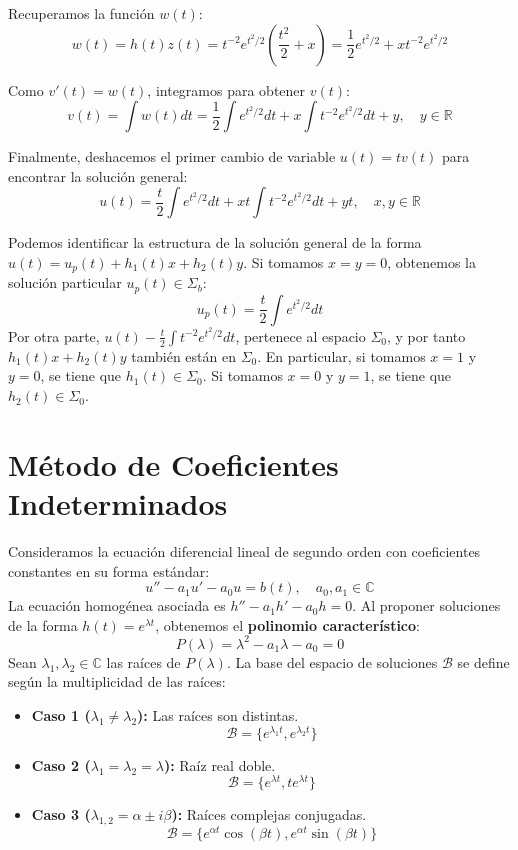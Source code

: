 {    Recuperamos la función $w(t)$:
    \[ w(t) = h(t)z(t) = t^{-2}e^{t^2/2} \left(\frac{t^2}{2} + x\right) = \frac{1}{2}e^{t^2/2} + x t^{-2}e^{t^2/2} \]

    Como $v'(t) = w(t)$, integramos para obtener $v(t)$:
    \[ v(t) = \int w(t) dt = \frac{1}{2}\int e^{t^2/2} dt + x\int t^{-2}e^{t^2/2} dt + y, \quad y \in \mathbb{R} \]

    Finalmente, deshacemos el primer cambio de variable $u(t) = tv(t)$ para encontrar la solución general:
    \[ u(t) = \frac{t}{2}\int e^{t^2/2} dt + x t\int t^{-2}e^{t^2/2} dt + yt, \quad x, y \in \mathbb{R} \]

    Podemos identificar la estructura de la solución general de la forma $u(t) = u_p(t) + h_1(t)x + h_2(t)y$. 
    Si tomamos $x = y = 0$, obtenemos la solución particular $u_p(t) \in \Sigma_b$:
    \[ u_p(t) = \frac{t}{2}\int e^{t^2/2} dt \]
    Por otra parte, $u(t) - \frac{t}{2}\int t^{-2}e^{t^2/2} dt $, pertenece al espacio $\Sigma_0$, y por tanto $h_1(t)x + h_2(t)y$ también están en $\Sigma_0$.
    En particular, si tomamos $x = 1$ y $y = 0$, se tiene que $h_1(t) \in \Sigma_0$.
    Si tomamos $x = 0$ y $y = 1$, se tiene que $h_2(t) \in \Sigma_0$.
}
\section*{Método de Coeficientes Indeterminados}

Consideramos la ecuación diferencial lineal de segundo orden con coeficientes constantes en su forma estándar:
\[
    u'' - a_1 u' - a_0 u = b(t), \quad a_0, a_1 \in \mathbb{C} 
\]
La ecuación homogénea asociada es $h'' - a_1 h' - a_0 h = 0$. Al proponer soluciones de la forma $h(t) = e^{\lambda t}$, obtenemos el \textbf{polinomio característico}:
\[ P(\lambda) = \lambda^2 - a_1 \lambda - a_0 = 0 \]
Sean $\lambda_1, \lambda_2 \in \mathbb{C}$ las raíces de $P(\lambda)$. La base del espacio de soluciones $\mathcal{B}$ se define según la multiplicidad de las raíces:
\begin{itemize}
    \item \textbf{Caso 1 ($\lambda_1 \neq \lambda_2$):} Las raíces son distintas. 
    \[ \mathcal{B} = \{e^{\lambda_1 t}, e^{\lambda_2 t}\} \]
    \item \textbf{Caso 2 ($\lambda_1 = \lambda_2 = \lambda$):} Raíz real doble. 
    \[ \mathcal{B} = \{e^{\lambda t}, t e^{\lambda t}\} \]
    \item \textbf{Caso 3 ($\lambda_{1,2} = \alpha \pm i\beta$):} Raíces complejas conjugadas. 
    \[ \mathcal{B} = \{e^{\alpha t} \cos(\beta t), e^{\alpha t} \sin(\beta t)\} \]
\end{itemize}

